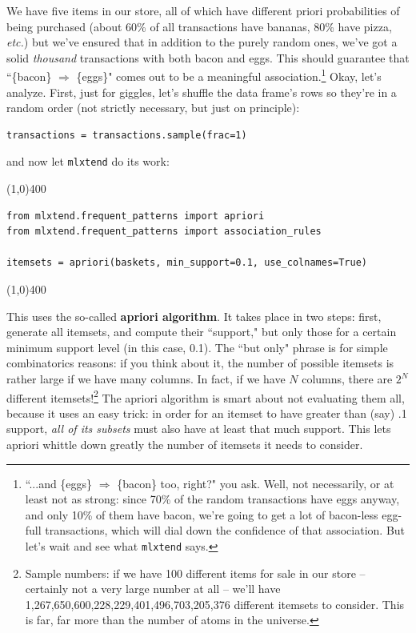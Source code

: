 \documentclass[12pt]{article}
\begin{document}
We have five items in our store, all of which have different priori
probabilities of being purchased (about 60\% of all transactions have bananas,
80\% have pizza, \textit{etc.}) but we've ensured that in addition to the
purely random ones, we've got a solid \textit{thousand} transactions with both
bacon and eggs. This should guarantee that ``\{bacon\} $\Rightarrow$ \{eggs\}"
comes out to be a meaningful association.\footnote{``...and \{eggs\}
$\Rightarrow$ \{bacon\} too, right?" you ask. Well, not necessarily, or at
least not as strong: since 70\% of the random transactions have eggs anyway,
and only 10\% of them have bacon, we're going to get a lot of bacon-less
egg-full transactions, which will dial down the confidence of that
association. But let's wait and see what \texttt{mlxtend} says.}
\pagebreak
Okay, let's analyze. First, just for giggles, let's shuffle the data frame's
rows so they're in a random order (not strictly necessary, but just on
principle):

\begin{Verbatim}[fontsize=\small,samepage=true,frame=none]
transactions = transactions.sample(frac=1)
\end{Verbatim}

and now let \texttt{mlxtend} do its work:
\begin{center}
\line(1,0){400}
\end{center}
\begin{Verbatim}[fontsize=\small,samepage=true,frame=none]
from mlxtend.frequent_patterns import apriori
from mlxtend.frequent_patterns import association_rules

itemsets = apriori(baskets, min_support=0.1, use_colnames=True)
\end{Verbatim}
\vspace{-.3in}
\begin{center}
\line(1,0){400}
\end{center}

This uses the so-called \textbf{apriori algorithm}. It takes place in two
steps: first, generate all itemsets, and compute their ``support," but only
those for a certain minimum support level (in this case, 0.1). The ``but only"
phrase is for simple combinatorics reasons: if you think about it, the number
of possible itemsets is rather large if we have many columns. In fact, if we
have $N$ columns, there are $2^N$ different itemsets!\footnote{Sample numbers:
if we have 100 different items for sale in our store -- certainly not a very
large number at all -- we'll have 1,267,650,600,228,229,401,496,703,205,376
different itemsets to consider. This is far, far more than the number of atoms
in the universe.} The apriori algorithm is smart about not evaluating them
all, because it uses an easy trick: in order for an itemset to have greater
than (say) .1 support, \textit{all of its subsets} must also have at least
that much support. This lets apriori whittle down greatly the number of
itemsets it needs to consider.
\end{document}
